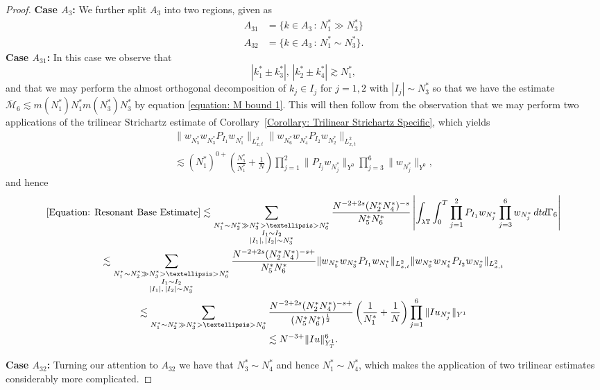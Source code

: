 \documentclass[10pt,a4paper]{amsart}
\begin{document}
\begin{proof}
    \textbf{Case $A_3$: } We further split $A_3$ into two regions, given as
    \begin{align*}
        A_{31} &= \{k\in A_3\,:\,N_1^*\gg N_3^*\}\\
        A_{32} &= \{k\in A_3\,:\, N_1^*\sim N_3^*\}.
    \end{align*}
    \textbf{Case $A_{31}$:} In this case we observe that
    \[
    |k_1^*\pm k_3^*|,\,|k_2^*\pm k_4^*|\gtrsim N_1^*,
    \]
    and that we may perform the almost orthogonal decomposition of $k_j\in I_j$ for $j = 1,2$ with $|I_j|\sim N_3^*$ so that we have the estimate $\overline{\mathcal{M}}_6\lesssim m(N_1^*)N_1^*m(N_3^*)N_3^*$ by equation \eqref{equation: M bound 1}. This will then follow from the observation that we may perform two applications of the trilinear Strichartz estimate of Corollary~\ref{Corollary: Trilinear Strichartz Specific}, which yields
    \begin{multline*}
    \|w_{N_5^*}w_{N_3^*}P_{I_1}w_{N_1^*}\|_{L^2_{x,t}}\|w_{N_6^*}w_{N_4^*}P_{I_2}w_{N_2^*}\|_{L^2_{x,t}}\\
    \lesssim (N_1^*)^{0+}\left(\frac{N_5^*}{N_1^*}+\frac{1}{N}\right)\prod_{j=1}^2 \|P_{I_j}w_{N_j^*}\|_{Y^0}\prod_{j=3}^6\|w_{N_j^*}\|_{Y^0},
    \end{multline*}
    and hence
    \begin{multline*}
        \eqref{Equation: Resonant Base Estimate}\lesssim \sum_{\substack{N_1^*\sim N_2^*\gg N_3^*>\dots> N_6^*\\I_1\sim I_2\\|I_1|,\,|I_2|\sim N_3^*}}\frac{N^{-2+2s}(N_{2}^*N_4^*)^{-s}}{N_5^*N_6^*}\left|\int_{\lambda\mathbb{T}}\int_0^T\prod_{j=1}^2P_{I_1}w_{N_j^*}\prod_{j=3}^6w_{N_j^*}\,dtd\Gamma_6\right|\\
        \lesssim \sum_{\substack{N_1^*\sim N_2^*\gg N_3^*>\dots> N_6^*\\I_1\sim I_2\\|I_1|,\,|I_2|\sim N_3^*}}\frac{N^{-2+2s}(N_{2}^*N_4^*)^{-s+}}{N_5^*N_6^*}\|w_{N_5^*}w_{N_3^*}P_{I_1}w_{N_1^*}\|_{L^2_{x,t}}\|w_{N_6^*}w_{N_4^*}P_{I_2}w_{N_2^*}\|_{L^2_{x,t}}\\
        \lesssim\sum_{N_1^*\sim N_2^*\gg N_3^*>\dots> N_6^*}\frac{N^{-2+2s}(N_{2}^*N_4^*)^{-s+}}{(N_5^*N_6^*)^{\frac12}}\left(\frac{1}{N_1^*} + \frac{1}{N}\right)\prod_{j=1}^6 \|Iu_{N_j^*}\|_{Y^1}\\
        \lesssim N^{-3+}\|Iu\|_{Y^1_T}^6.
    \end{multline*}
    
    \textbf{Case $A_{32}$:} Turning our attention to $A_{32}$ we have that $N_3^*\sim N_4^*$ and hence $N_1^*\sim N_4^*$, which makes the application of two trilinear estimates considerably more complicated.


\end{proof}
\end{document}
